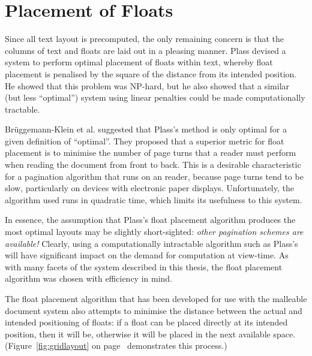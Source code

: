 
\section{Placement of Floats}
Since all text layout is precomputed, the only remaining concern is that the columns of text and floats are laid out in a pleasing manner. Plass\hspace{0pt}\cite{Plass1981} devised a system to perform optimal placement of floats within text, whereby float placement is penalised by the square of the distance from its intended position. He showed that this problem was NP-hard, but he also showed that a similar (but less ``optimal'') system using linear penalties could be made computationally tractable.

Br\"uggemann-Klein et al.\hspace{0pt}\cite{Bruggemann-Klein1995} suggested that Plass's method is only optimal for a given definition of ``optimal''. They proposed that a superior metric for float placement is to minimise the number of page turns that a reader must perform when reading the document from front to back. This is a desirable characteristic for a pagination algorithm that runs on an \ebook{} reader, because page turns tend to be slow, particularly on devices with electronic paper displays. Unfortunately, the algorithm used runs in quadratic time, which limits its usefulness to this system.

In essence, the assumption that Plass's float placement algorithm produces the most optimal layouts may be slightly short-sighted: \emph{other pagination schemes are available!} Clearly, using a computationally intractable algorithm such as Plass's will have significant impact on the demand for computation at view-time. As with many facets of the system described in this thesis, the float placement algorithm was chosen with efficiency in mind.

The float placement algorithm that has been developed for use with the malleable document system also attempts to minimise the distance between the actual and intended positioning of floats: if a float can be placed directly at its intended position, then it will be, otherwise it will be placed in the next available space. (Figure~\ref{fig:gridlayout} on page~\pageref{fig:gridlayout} demonstrates this process.)


